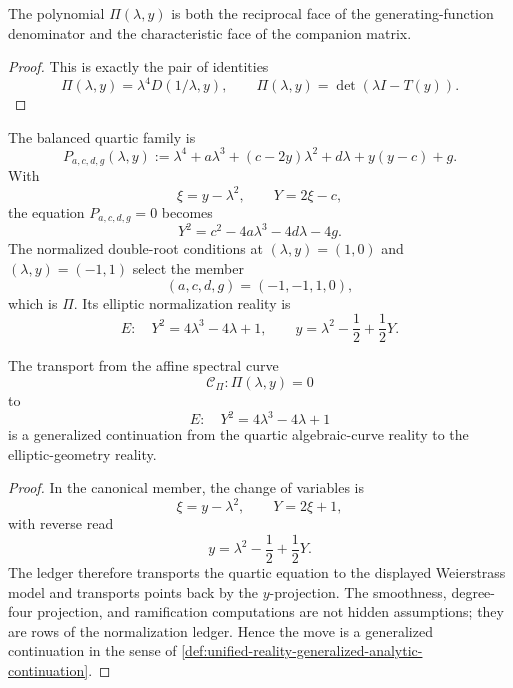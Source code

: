 
\begin{corollary}
\label{cor:unified-reality-quartic-spectral-polynomial-not-external}
The polynomial $\Pi(\lambda,y)$ is both the reciprocal face of the
generating-function denominator and the characteristic face of the
companion matrix.
\end{corollary}

\begin{proof}
This is exactly the pair of identities
$$
\Pi(\lambda,y)=\lambda^4D(1/\lambda,y),
\qquad
\Pi(\lambda,y)=\det(\lambda I-T(y)).
$$
\end{proof}

\begin{definition}
\label{def:unified-reality-quartic-balanced-elliptic-normalization}
The balanced quartic family is
$$
P_{a,c,d,g}(\lambda,y)
:=
\lambda^4+a\lambda^3+(c-2y)\lambda^2+d\lambda+y(y-c)+g.
$$
With
$$
\xi=y-\lambda^2,
\qquad
Y=2\xi-c,
$$
the equation $P_{a,c,d,g}=0$ becomes
$$
Y^2=c^2-4a\lambda^3-4d\lambda-4g.
$$
The normalized double-root conditions at $(\lambda,y)=(1,0)$ and
$(\lambda,y)=(-1,1)$ select the member
$$
(a,c,d,g)=(-1,-1,1,0),
$$
which is $\Pi$. Its elliptic normalization reality is
$$
E:\quad Y^2=4\lambda^3-4\lambda+1,
\qquad
y=\lambda^2-\frac12+\frac12Y.
$$
\end{definition}

\begin{theorem}
\label{thm:unified-reality-quartic-elliptic-normalization-continuation}
The transport from the affine spectral curve
$$
\mathcal C_{\Pi}:\Pi(\lambda,y)=0
$$
to
$$
E:\quad Y^2=4\lambda^3-4\lambda+1
$$
is a generalized continuation from the quartic algebraic-curve reality
to the elliptic-geometry reality.
\end{theorem}

\begin{proof}
In the canonical member, the change of variables is
$$
\xi=y-\lambda^2,
\qquad
Y=2\xi+1,
$$
with reverse read
$$
y=\lambda^2-\frac12+\frac12Y.
$$
The ledger therefore transports the quartic equation to the displayed
Weierstrass model and transports points back by the $y$-projection. The
smoothness, degree-four projection, and ramification computations are
not hidden assumptions; they are rows of the normalization ledger.
Hence the move is a generalized continuation in the sense of
\autoref{def:unified-reality-generalized-analytic-continuation}.
\end{proof}


